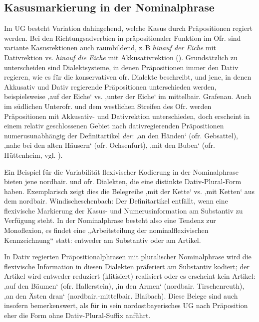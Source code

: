 \subsection{Kasusmarkierung in der Nominalphrase}\label{sec:9.1.2}
Im UG besteht Variation dahingehend, welche Kasus durch Präpositionen regiert werden. Bei den Richtungsadverbien in präpositionaler Funktion im Ofr. sind variante Kasusrektionen auch raumbildend, z.\,B \textit{hinauf der Eiche} mit Dativrektion vs. \textit{hinauf die Eiche} mit Akkusativrektion (\citealt[435--436 und Karten 121--125]{SMF7}). Grundsätzlich zu unterscheiden sind Dialektsysteme, in denen Präpositionen immer den Dativ regieren, wie es \citet[93]{Rowley1997} für die konservativen ofr. Dialekte beschreibt, und jene, in denen Akkusativ und Dativ regierende Präpositionen unterschieden werden, beispielsweise   ‚auf der Eiche‘ vs.    ‚unter der Eiche‘ im mittelbair. Grafenau. Auch im südlichen Unterofr. und dem westlichen Streifen des Ofr. werden Präpositionen mit Akkusativ- und Dativrektion unterschieden, doch erscheint in einem relativ geschlossenen Gebiet nach dativregierenden Präpositionen numerusunabhängig der Definitartikel \textit{der}:    ‚an den Händen‘ (ofr. Gebsattel),      ‚nahe bei den alten Häusern‘ (ofr. Ochsenfurt),   ‚mit den Buben‘ (ofr. Hüttenheim, vgl. \citealt[Karte 56]{SUF3}).

Ein Beispiel für die Variabilität flexivischer Kodierung in der Nominalphrase bieten jene nordbair. und ofr. Dialekten, die eine distinkte Dativ-Plural-Form haben. Exemplarisch zeigt dies die Belegreihe 
 ‚mit der Kette‘ vs.   ‚mit Ketten‘ aus dem nordbair. Windischeschenbach: Der Definitartikel entfällt, wenn eine flexivische Markierung der Kasus- und Numerusinformation am Substantiv zu Verfügung steht. In der Nominalphrase besteht also eine Tendenz zur Monoflexion, es findet eine „Arbeitsteilung der nominalflexivischen Kennzeichnung“ \citep[387]{Harnisch2019} statt: entweder am Substantiv oder am Artikel.

In Dativ regierten Präpositionalphrasen mit pluralischer Nominalphrase wird die flexivische Information in diesen Dialekten präferiert am Substantiv kodiert; der Artikel wird entweder reduziert (klitisiert) realisiert oder es erscheint kein Artikel:   ‚auf den Bäumen‘ (ofr. Hallerstein),   ‚in den Armen‘ (nordbair. Tirschenreuth),    ‚an den Ästen dran‘ (nordbair.-mittelbair. Blaibach). Diese Belege sind auch insofern bemerkenswert, als \citet[95]{Rowley1997} für in sein nordostbayerisches UG nach Präposition eher die Form ohne Dativ-Plural-Suffix anführt.\largerpage[2]

